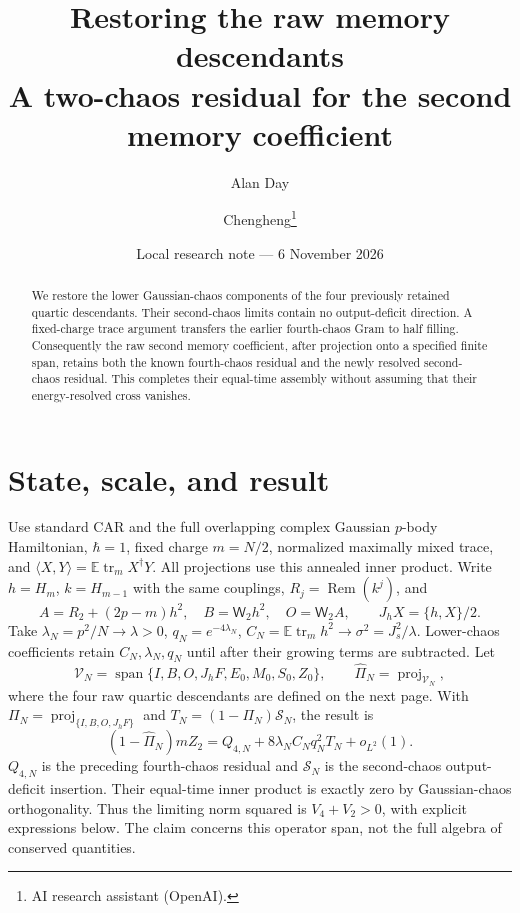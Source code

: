 \documentclass[11pt,a4paper]{article}
\title{Restoring the raw memory descendants\\A two-chaos residual for the second memory coefficient}
\author{Alan Day \and Chengheng\thanks{AI research assistant (OpenAI).}}
\date{Local research note --- 6 November 2026}
\newcommand{\EE}{\mathbb E}
\newcommand{\tr}{\operatorname{tr}}
\newcommand{\Rem}{\operatorname{Rem}}
\newcommand{\W}[1]{\mathsf W_{#1}}
\begin{document}
\maketitle
\begin{abstract}
We restore the lower Gaussian-chaos components of the four previously
retained quartic descendants. Their second-chaos limits contain no
output-deficit direction. A fixed-charge trace argument transfers
the earlier fourth-chaos Gram to half filling. Consequently the raw
second memory coefficient, after projection onto a specified finite
span, retains both the known fourth-chaos residual and the newly
resolved second-chaos residual. This completes their equal-time
assembly without assuming that their energy-resolved cross vanishes.
\end{abstract}
\section{State, scale, and result}
Use standard CAR and the full overlapping complex Gaussian $p$-body
Hamiltonian, $\hbar=1$, fixed charge $m=N/2$, normalized maximally
mixed trace, and $\langle X,Y\rangle=\EE\tr_m X^\dagger Y$.
All projections use this annealed inner product. Write $h=H_m$,
$k=H_{m-1}$ with the same couplings, $R_j=\Rem(k^j)$, and
\begin{equation}
 A=R_2+(2p-m)h^2,\quad B=\W2h^2,\quad O=\W2A,
 \qquad J_hX=\{h,X\}/2.
\end{equation}
Take $\lambda_N=p^2/N\to\lambda>0$, $q_N=e^{-4\lambda_N}$,
$C_N=\EE\tr_mh^2\to\sigma^2=J_s^2/\lambda$. Lower-chaos
coefficients retain $C_N,\lambda_N,q_N$ until after their growing
terms are subtracted. Let
\begin{equation}
 \mathcal V_N=\operatorname{span}
 \{I,B,O,J_hF,E_0,M_0,S_0,Z_0\},
 \qquad \widehat\Pi_N=\operatorname{proj}_{\mathcal V_N},
\end{equation}
where the four raw quartic descendants are defined on the next page.
With $\Pi_N=\operatorname{proj}_{\{I,B,O,J_hF\}}$ and
$T_N=(1-\Pi_N)\mathcal S_N$, the result is
\begin{equation}
 (1-\widehat\Pi_N)mZ_2
 =Q_{4,N}+8\lambda_N C_Nq_N^2T_N+o_{L^2}(1).\label{main}
\end{equation}
$Q_{4,N}$ is the preceding fourth-chaos residual and
$\mathcal S_N$ is the second-chaos output-deficit insertion.
Their equal-time inner product is exactly zero by Gaussian-chaos
orthogonality. Thus the limiting norm squared is $V_4+V_2>0$,
with explicit expressions below. The claim concerns this operator
span, not the full algebra of conserved quantities.
\end{document}
